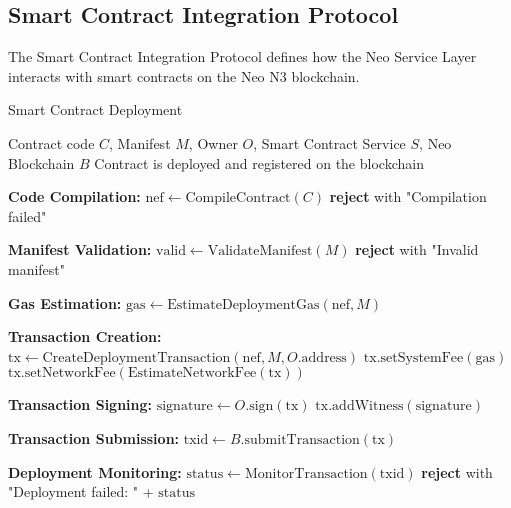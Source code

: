 \subsection{Smart Contract Integration Protocol}
\label{subsec:smart-contract-protocol}

The Smart Contract Integration Protocol defines how the Neo Service Layer interacts with smart contracts on the Neo N3 blockchain.

\begin{tcolorbox}[
    enhanced,
    colback=blue!5!white,
    colframe=blue!75!black,
    arc=5mm,
    boxrule=1.5pt,
    title=Smart Contract Deployment Protocol,
    fonttitle=\bfseries,
    coltitle=white,
    attach boxed title to top left={yshift=-2mm, xshift=5mm},
    boxed title style={colback=blue!75!black, rounded corners},
    shadow={2mm}{-2mm}{0mm}{black!50},
    drop fuzzy shadow
]
\begin{protocol}{Smart Contract Deployment}
\label{prot:smart-contract-deployment}
\begin{algorithmic}[1]
\Require Contract code $C$, Manifest $M$, Owner $O$, Smart Contract Service $S$, Neo Blockchain $B$
\Ensure Contract is deployed and registered on the blockchain

\State \textbf{Code Compilation:}
\State $\text{nef} \gets \text{CompileContract}(C)$
    \State \textbf{reject} with "Compilation failed"
\EndIf

\State \textbf{Manifest Validation:}
\State $\text{valid} \gets \text{ValidateManifest}(M)$
    \State \textbf{reject} with "Invalid manifest"
\EndIf

\State \textbf{Gas Estimation:}
\State $\text{gas} \gets \text{EstimateDeploymentGas}(\text{nef}, M)$

\State \textbf{Transaction Creation:}
\State $\text{tx} \gets \text{CreateDeploymentTransaction}(\text{nef}, M, O.\text{address})$
\State $\text{tx}.\text{setSystemFee}(\text{gas})$
\State $\text{tx}.\text{setNetworkFee}(\text{EstimateNetworkFee}(\text{tx}))$

\State \textbf{Transaction Signing:}
\State $\text{signature} \gets O.\text{sign}(\text{tx})$
\State $\text{tx}.\text{addWitness}(\text{signature})$

\State \textbf{Transaction Submission:}
\State $\text{txid} \gets B.\text{submitTransaction}(\text{tx})$

\State \textbf{Deployment Monitoring:}
\State $\text{status} \gets \text{MonitorTransaction}(\text{txid})$
    \State \textbf{reject} with "Deployment failed: " + $\text{status}$
\EndIf


\end{algorithmic}
\end{protocol}
\end{tcolorbox}
